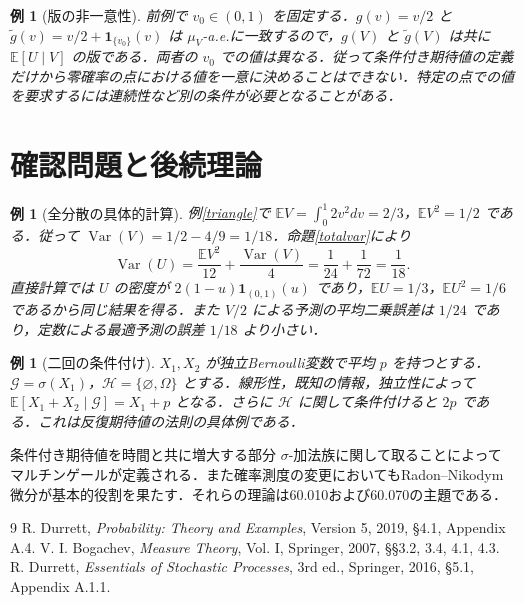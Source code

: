 \documentclass[a5paper,10pt,onecolumn]{jsarticle}
\theoremstyle{mathnotetheorem}
\newtheorem{example}[theorem]{例}
\newcommand{\G}{\mathcal G}
\newcommand{\E}{\mathbb E}
\newcommand{\1}{\mathbf{1}}
\DeclareMathOperator{\Var}{Var}
\begin{document}
\begin{example}[版の非一意性]
前例で $v_0\in(0,1)$ を固定する．$g(v)=v/2$ と $\widetilde g(v)=v/2+\1_{\{v_0\}}(v)$ は $\mu_V$-a.e.に一致するので，$g(V)$ と $\widetilde g(V)$ は共に $\E[U\mid V]$ の版である．両者の $v_0$ での値は異なる．従って条件付き期待値の定義だけから零確率の点における値を一意に決めることはできない．特定の点での値を要求するには連続性など別の条件が必要となることがある．
\end{example}

\section{確認問題と後続理論}
\begin{example}[全分散の具体的計算]
例\ref{triangle}で $\E V=\int_0^1 2v^2dv=2/3$，$\E V^2=1/2$ である．従って $\Var(V)=1/2-4/9=1/18$．命題\ref{totalvar}により
\[
 \Var(U)=\frac{\E V^2}{12}+\frac{\Var(V)}4
 =\frac1{24}+\frac1{72}=\frac1{18}.
\]
直接計算では $U$ の密度が $2(1-u)\1_{(0,1)}(u)$ であり，$\E U=1/3$，$\E U^2=1/6$ であるから同じ結果を得る．また $V/2$ による予測の平均二乗誤差は $1/24$ であり，定数による最適予測の誤差 $1/18$ より小さい．
\end{example}
\begin{example}[二回の条件付け]
$X_1,X_2$ が独立Bernoulli変数で平均 $p$ を持つとする．$\G=\sigma(X_1)$，$\mathcal H=\{\varnothing,\Omega\}$ とする．線形性，既知の情報，独立性によって $\E[X_1+X_2\mid\G]=X_1+p$ となる．さらに $\mathcal H$ に関して条件付けると $2p$ である．これは反復期待値の法則の具体例である．
\end{example}
条件付き期待値を時間と共に増大する部分 $\sigma$-加法族に関して取ることによってマルチンゲールが定義される．また確率測度の変更においてもRadon--Nikodym微分が基本的役割を果たす．それらの理論は60.010および60.070の主題である．
\begin{thebibliography}{9}
 R. Durrett, \textit{Probability: Theory and Examples}, Version 5, 2019, \S4.1, Appendix A.4.
 V. I. Bogachev, \textit{Measure Theory}, Vol. I, Springer, 2007, \S\S3.2, 3.4, 4.1, 4.3.
 R. Durrett, \textit{Essentials of Stochastic Processes}, 3rd ed., Springer, 2016, \S5.1, Appendix A.1.1.
\end{thebibliography}
\end{document}
